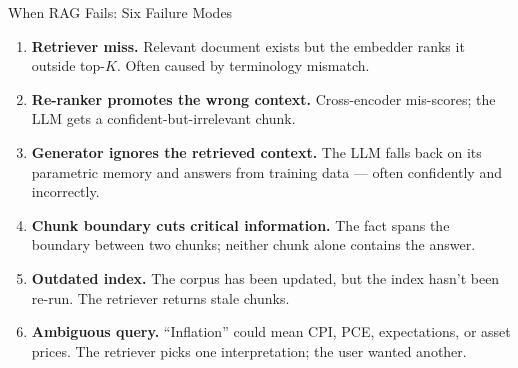 \begin{frame}{When RAG Fails: Six Failure Modes}
\begin{enumerate}
\item \textbf{Retriever miss.} Relevant document exists but the embedder ranks it outside top-$K$. Often caused by terminology mismatch.

\medskip
\item \textbf{Re-ranker promotes the wrong context.} Cross-encoder mis-scores; the LLM gets a confident-but-irrelevant chunk.

\medskip
\item \textbf{Generator ignores the retrieved context.} The LLM falls back on its parametric memory and answers from training data --- often confidently and incorrectly.

\medskip
\item \textbf{Chunk boundary cuts critical information.} The fact spans the boundary between two chunks; neither chunk alone contains the answer.

\medskip
\item \textbf{Outdated index.} The corpus has been updated, but the index hasn't been re-run. The retriever returns stale chunks.

\medskip
\item \textbf{Ambiguous query.} ``Inflation'' could mean CPI, PCE, expectations, or asset prices. The retriever picks one interpretation; the user wanted another.
\end{enumerate}
\end{frame}

